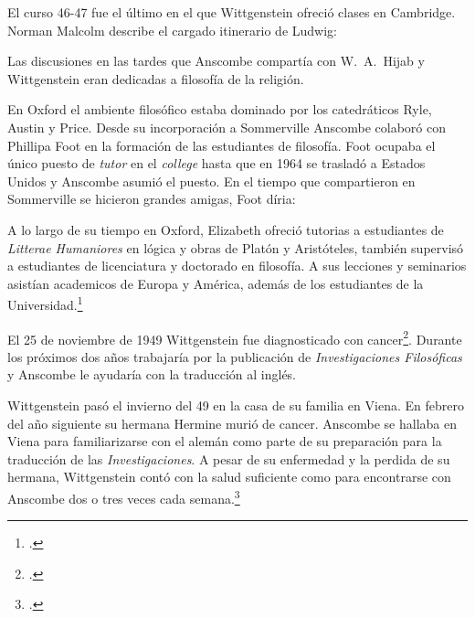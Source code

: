     El curso 46-47 fue el último en el que Wittgenstein ofreció clases en Cambridge.
    Norman Malcolm describe el cargado itinerario de Ludwig:

    Las discusiones en las tardes que Anscombe compartía con W.~A.~Hijab y
    Wittgenstein eran dedicadas a filosofía de la religión.

    En Oxford el ambiente filosófico estaba dominado por los catedráticos Ryle,
    Austin y Price. Desde su incorporación a Sommerville Anscombe colaboró con
    Phillipa Foot en la formación de las estudiantes de filosofía. Foot ocupaba
    el único puesto de \emph{tutor} en el \emph{college} hasta que en 1964 se
    trasladó a Estados Unidos y Anscombe asumió el puesto. En el tiempo que
    compartieron en Sommerville se hicieron grandes amigas, Foot díria:

    A lo largo de su tiempo en Oxford, Elizabeth ofreció tutorias a estudiantes de
    \emph{Litterae Humaniores} en lógica y obras de Platón y Aristóteles, también
    supervisó a estudiantes de licenciatura y doctorado en filosofía. A sus
    lecciones y seminarios asistían academicos de Europa y América, además de los
    estudiantes de la Universidad.\footcite[cfr.~][p.~32]{biofellows}

    El 25 de noviembre de 1949 Wittgenstein fue diagnosticado con
    cancer\footcite[cf.~][loc 11034]{monk}. Durante los próximos dos años trabajaría
    por la publicación de \emph{Investigaciones Filosóficas} y Anscombe le ayudaría
    con la traducción al inglés. 

    Wittgenstein pasó el invierno del 49 en la casa de su familia en Viena. En
    febrero del año siguiente su hermana Hermine murió de cancer. Anscombe se
    hallaba en Viena para familiarizarse con el alemán como parte de su preparación
    para la traducción de las \emph{Investigaciones}. A pesar de su enfermedad y la
    perdida de su hermana, Wittgenstein contó con la salud suficiente como para
    encontrarse con Anscombe dos o tres veces cada semana.\footcite[cf.~][loc
    11138]{monk}

